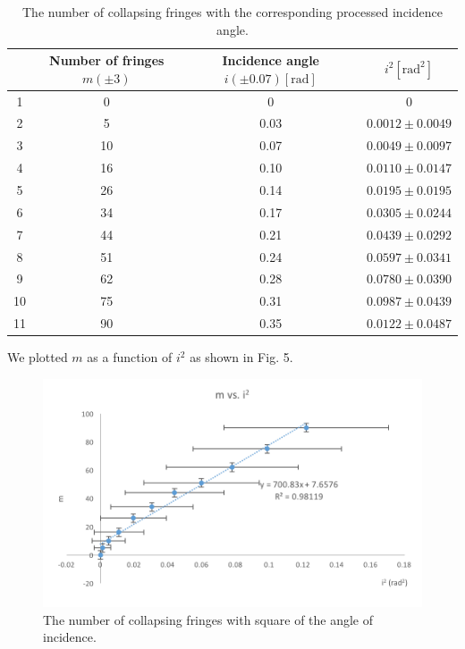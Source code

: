 \documentclass[12pt]{article}
\begin{document}
\begin{table}[!ht]
	
	\begin{center}
		\caption{The number of collapsing fringes with the corresponding processed incidence angle. }
		\begin{tabular}{|c|c|c|c|}
			\hline\hline
			
			 & Number of fringes $m (\pm{3})$&	Incidence angle $i (\pm{0.07}) [\si{\radian}]$&$i^2 [\si{\radian\squared}]$\\ \hline
			 1&0&0&0\\ \hline
			 2&5&0.03&$0.0012\pm0.0049$\\ \hline
			 3&10&0.07&$0.0049\pm0.0097$\\ \hline
			 4&16&0.10&$0.0110\pm0.0147$\\ \hline
			 5&26&0.14&$0.0195\pm0.0195$\\ \hline
			 6&34&0.17&$0.0305\pm0.0244$\\ \hline
			 7&44&0.21&$0.0439\pm0.0292$\\ \hline
			 8&51&0.24&$0.0597\pm0.0341$\\ \hline
			 9&62&0.28&$0.0780\pm0.0390$\\ \hline
			 10&75&0.31&$0.0987\pm0.0439$\\ \hline
			 11&90&0.35&$0.0122\pm0.0487$\\ \hline
	
		\end{tabular}
	\end{center}
\end{table}

We plotted $m$ as a function of $i^{2}$ as shown in Fig. 5. 
\begin{figure}[!hbt]
	\begin{center}
		\includegraphics[width=13cm]{Picture5}
		\caption{The number of collapsing fringes with square of the angle of incidence.}
	\end{center}
\end{figure}
\end{document}
